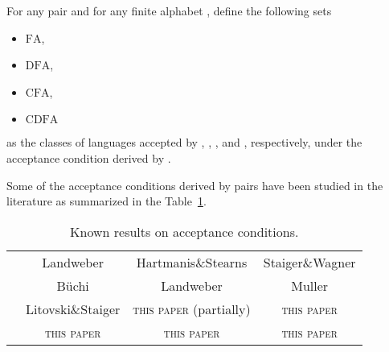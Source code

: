 \documentclass[preprint]{elsarticle}
\makeatletter
\newcommand{\ie}{\emph{i.e.}\@\xspace}
\newcommand{\FA}{\ensuremath{\mathrm{FA}}\xspace}
\newcommand{\CFA}{\ensuremath{\mathrm{CFA}}\xspace}
\newcommand{\DFA}{\ensuremath{\mathrm{DFA}}\xspace}
\newcommand{\CDFA}{\ensuremath{\mathrm{CDFA}}\xspace}
\newtheorem{lemma}[theorem]{Lemma}
\makeatother
\begin{document}
\begin{definition}
\label{classes_of_language}
For any pair  and for any finite alphabet , define the following sets 
\begin{itemize}
\item
\FA\Sigma,
\item
\DFA\Sigma,
\item
\CFA\Sigma,
\item
\CDFA\Sigma
\end{itemize}
as the classes of languages accepted by , , , and , respectively, under the acceptance condition derived by .
\end{definition}
\begin{comment}
Let  and  be two sets,  denotes the projection of words in  on the first set, \ie .


\begin{lemma}[Staiger \protect{\cite[Projection lemma]{staiger1997}}]\mbox{}\\
\label{projection}
Let .
\begin{enumerate}
\item
Let ,  be two finite alphabets.  implies 
\item
Let  be a finite alphabet.  implies there exist a finite alphabet  and a language  such that .
\end{enumerate}
\end{lemma}
\end{comment}


Some of the acceptance conditions derived by pairs  have been studied in the literature as summarized in the Table~\ref{known_results}.
\begin{table}[htb]
\begin{center}\small
\begin{tabular}{|c|c|c|c|}
\hline
&  &  &  \\
\hline
 & Landweber \cite{landweber1969} & Hartmanis\;\&\;Stearns \cite{Hartmanis1967} & Staiger\;\&\;Wagner \cite{Staiger1974}\\
\hline
 & B\"uchi \cite{Buchi1960} & Landweber \cite{landweber1969} & Muller \cite{Muller1963}\\
\hline
 & Litovski\;\&\;Staiger \cite{Litovsky1997} &  \textsc{this paper} (partially) & \textsc{this paper}\footnotemark[2]\\
\hline
 & \textsc{this paper}\footnotemark[1] & \textsc{this paper}\footnotemark[1] & \textsc{this paper}\\
\hline
\end{tabular}
\end{center}
\caption{Known results on acceptance conditions.}
\label{known_results}
\end{table}
\end{document}
